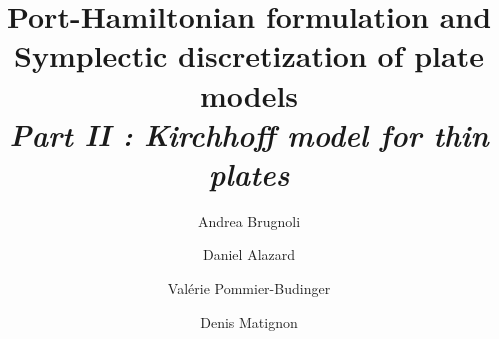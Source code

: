 \documentclass[preprint,12pt]{elsarticle}
\begin{document}
	
	\begin{frontmatter}	
		
		\title{Port-Hamiltonian formulation and \\
		Symplectic discretization of plate models\\
		\vspace{2mm} \large\textit{Part II : Kirchhoff model for thin plates}}	
		\author[ISAE]{Andrea Brugnoli}
		
		\author[ISAE]{Daniel Alazard}
		
		\author[ISAE]{Valérie Pommier-Budinger}
		
		\author[ISAE]{Denis Matignon}
		
		
		
	    \address[ISAE]{ISAE-SUPAERO, Universit\'e de Toulouse, France.\\
		\vspace{2mm} {10 Avenue Edouard Belin, BP-54032, 31055 Toulouse Cedex 4.}}
		

\end{frontmatter}
\end{document}
